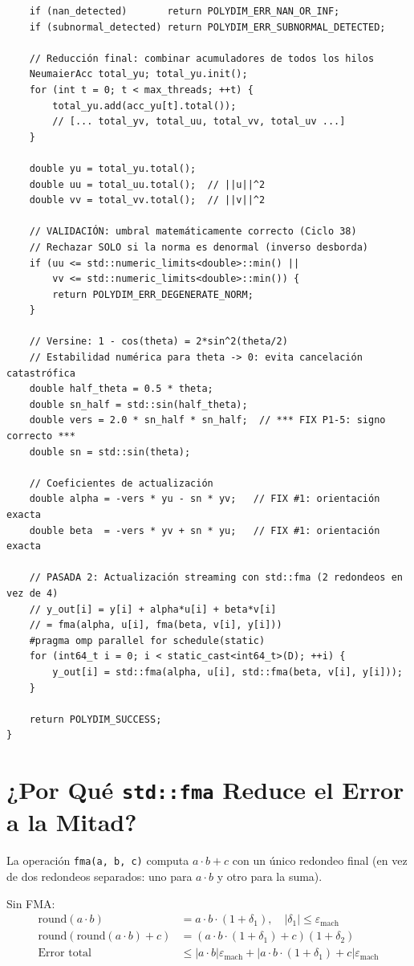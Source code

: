 \begin{verbatim}
    if (nan_detected)       return POLYDIM_ERR_NAN_OR_INF;
    if (subnormal_detected) return POLYDIM_ERR_SUBNORMAL_DETECTED;

    // Reducción final: combinar acumuladores de todos los hilos
    NeumaierAcc total_yu; total_yu.init();
    for (int t = 0; t < max_threads; ++t) {
        total_yu.add(acc_yu[t].total());
        // [... total_yv, total_uu, total_vv, total_uv ...]
    }

    double yu = total_yu.total();
    double uu = total_uu.total();  // ||u||^2
    double vv = total_vv.total();  // ||v||^2

    // VALIDACIÓN: umbral matemáticamente correcto (Ciclo 38)
    // Rechazar SOLO si la norma es denormal (inverso desborda)
    if (uu <= std::numeric_limits<double>::min() ||
        vv <= std::numeric_limits<double>::min()) {
        return POLYDIM_ERR_DEGENERATE_NORM;
    }

    // Versine: 1 - cos(theta) = 2*sin^2(theta/2)
    // Estabilidad numérica para theta -> 0: evita cancelación catastrófica
    double half_theta = 0.5 * theta;
    double sn_half = std::sin(half_theta);
    double vers = 2.0 * sn_half * sn_half;  // *** FIX P1-5: signo correcto ***
    double sn = std::sin(theta);

    // Coeficientes de actualización
    double alpha = -vers * yu - sn * yv;   // FIX #1: orientación exacta
    double beta  = -vers * yv + sn * yu;   // FIX #1: orientación exacta

    // PASADA 2: Actualización streaming con std::fma (2 redondeos en vez de 4)
    // y_out[i] = y[i] + alpha*u[i] + beta*v[i]
    // = fma(alpha, u[i], fma(beta, v[i], y[i]))
    #pragma omp parallel for schedule(static)
    for (int64_t i = 0; i < static_cast<int64_t>(D); ++i) {
        y_out[i] = std::fma(alpha, u[i], std::fma(beta, v[i], y[i]));
    }

    return POLYDIM_SUCCESS;
}
\end{verbatim}

\section{¿Por Qué \texttt{std::fma} Reduce el Error a la Mitad?}

La operación \texttt{fma(a, b, c)} computa $a \cdot b + c$ con un único redondeo
final (en vez de dos redondeos separados: uno para $a \cdot b$ y otro para la suma).

Sin FMA:
\begin{align}
\text{round}(a \cdot b) &= a \cdot b \cdot (1 + \delta_1), \quad |\delta_1| \le \varepsilon_{\text{mach}} \\
\text{round}(\text{round}(a \cdot b) + c) &= (a \cdot b \cdot (1 + \delta_1) + c)(1 + \delta_2) \\
\text{Error total} &\le |a \cdot b| \varepsilon_{\text{mach}} + |a \cdot b \cdot (1 + \delta_1) + c| \varepsilon_{\text{mach}}
\end{align}

